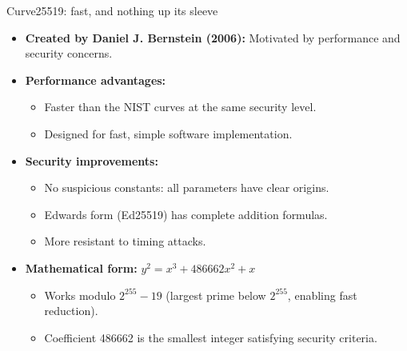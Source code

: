 \ifdefined\PRESENTATION\else\PassOptionsToClass{handout}{beamer}\fi\documentclass[aspectratio=169, lualatex]{beamer}
\begin{document}
\begin{frame}{Curve25519: fast, and nothing up its sleeve}
	\begin{itemize}
		\item \textbf{Created by Daniel J. Bernstein (2006):} Motivated by performance and security concerns.
		\item \textbf{Performance advantages:}
		      \begin{itemize}
			      \item Faster than the NIST curves at the same security level.
			      \item Designed for fast, simple software implementation.
		      \end{itemize}
		\item \textbf{Security improvements:}
		      \begin{itemize}
			      \item No suspicious constants: all parameters have clear origins.
			      \item Edwards form (Ed25519) has complete addition formulas.
			      \item More resistant to timing attacks.
		      \end{itemize}
		\item \textbf{Mathematical form:} $y^2 = x^3 + 486662x^2 + x$
		      \begin{itemize}
			      \item Works modulo $2^{255} - 19$ (largest prime below $2^{255}$, enabling fast reduction).
			      \item Coefficient 486662 is the smallest integer satisfying security criteria.
		      \end{itemize}
	\end{itemize}
\end{frame}
\end{document}
